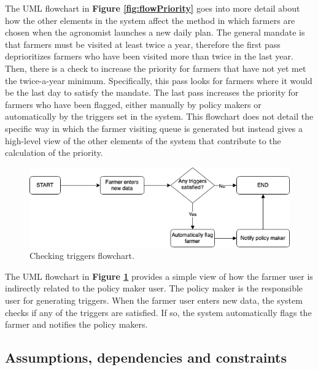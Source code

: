 \begin{flushleft}
The UML flowchart in \textbf{Figure \ref{fig:flowPriority}} goes into more detail about how the other elements in the system affect the method in which farmers are chosen when the agronomist launches a new daily plan. The general mandate is that farmers must be visited at least twice a year, therefore the first pass deprioritizes farmers who have been visited more than twice in the last year. Then, there is a check to increase the priority for farmers that have not yet met the twice-a-year minimum. Specifically, this pass looks for farmers where it would be the last day to satisfy the mandate. The last pass increases the priority for farmers who have been flagged, either manually by policy makers or automatically by the triggers set in the system. This flowchart does not detail the specific way in which the farmer visiting queue is generated but instead gives a high-level view of the other elements of the system that contribute to the calculation of the priority. 
\end{flushleft}


\newpage


\begin{figure}[hbt!]
\centering
\includegraphics[scale=0.4]{../images_diagrams/newfarmerdata_trigger.png}
\caption{\label{fig:flowNewDataTrig}Checking triggers flowchart.}
\end{figure}

\begin{flushleft}
The UML flowchart in \textbf{Figure \ref{fig:flowNewDataTrig}} provides a simple view of how the farmer user is indirectly related to the policy maker user. The policy maker is the responsible user for generating triggers. When the farmer user enters new data, the system checks if any of the triggers are satisfied. If so, the system automatically flags the farmer and notifies the policy makers. 
\end{flushleft}

\newpage
\subsection{Assumptions, dependencies and constraints}
